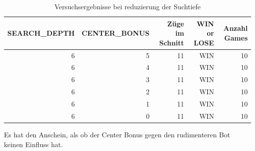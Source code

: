 \begin{table}[ht]
	\caption{Versuchsergebnisse bei reduzierung der Suchtiefe}\label{table:secondExperiemt}
	\begin{center}
		\begin{tabular}{r|r|r|r|r}
			SEARCH\_DEPTH & CENTER\_BONUS & Züge im Schnitt & WIN or LOSE & Anzahl Games\\
			\hline
			6 & 5 & 11 & WIN & 10 \\
			6 & 4 & 11 & WIN & 10\\
			6 & 3 & 11 & WIN & 10 \\
			6 & 2 & 11 & WIN & 10 \\
			6 & 1 & 11 & WIN & 10 \\
			6 & 0 & 11 & WIN & 10 \\
		\end{tabular}
	\end{center}
\end{table}

Es hat den Anschein, als ob der Center Bonus gegen den rudimenteren Bot keinen Einfluss hat. 

\newpage